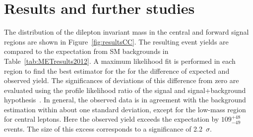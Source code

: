 \label{sec:counting}

\section{Results and further studies}

\label{sec:candcresults}
The distribution of the dilepton invariant mass in the central and forward signal regions are shown in Figure~\ref{fig:resultsCC}. The resulting event yields are compared to the expectation from SM backgrounds in Table~\ref{tab:METresults2012}. A maximum likelihood fit is performed in each region to find the best estimator for the for the difference of expected and observed yield. The significances of deviations of this difference from zero are evaluated using the profile likelihood ratio of the signal and signal+background hypothesis~\cite{HiggsTool1}. In general, the observed data is in agreement with the background estimation within about one standard deviation, except for the low-mass region for central leptons. Here the observed yield exceeds the expectation by $109^{+48}_{-49}$ events. The size of this excess corresponds to a significance of 2.2~$\sigma$.  
